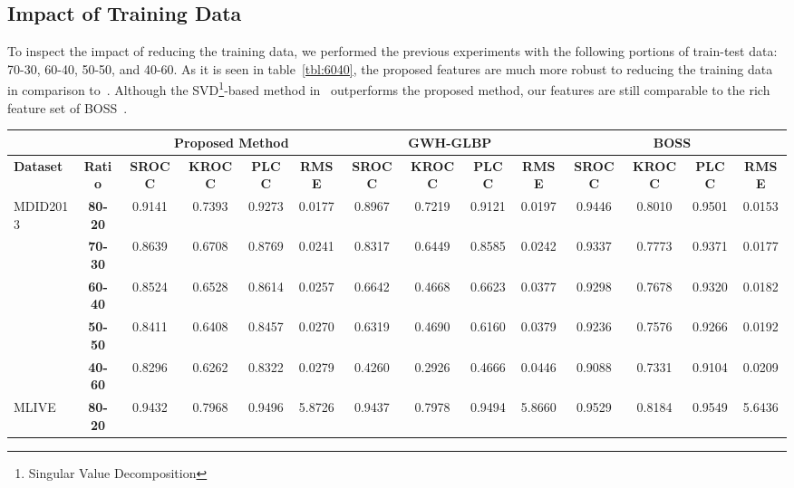 \subsection{Impact of Training Data}
To inspect the impact of reducing the training data, we performed the previous experiments with the following portions of train-test data: 70-30, 60-40, 50-50, and 40-60. As it is seen in table~\ref{tbl:6040}, the proposed features are much more robust to reducing the training data in comparison to~\cite{Li2016}. Although the SVD\footnote{Singular Value Decomposition}-based method in~\cite{Zhou2018} outperforms the proposed method, our features are still comparable to the rich feature set of BOSS~\cite{Zhou2018}.
\begin{sidewaystable}[htb]
    \caption{The Results for Changing the Ratio of Training Data.}
    \label{tbl:6040}
  \bigskip
    \centering\footnotesize\setlength\tabcolsep{2pt}
        \hspace*{-1cm}\begin{tabular}{m{1.7cm}|c||c|c|c|c||c|c|c|c||c|c|c|c}
             \multicolumn{2}{c||}{}&\multicolumn{4}{c||}{Proposed Method}&\multicolumn{4}{c||}{GWH-GLBP~\cite{Li2016}}&\multicolumn{4}{c}{BOSS~\cite{Zhou2018}}\\[1ex]
             \hline\hline
             \textbf{Dataset}&\textbf{Ratio}&\textbf{SROCC}&\textbf{KROCC}&\textbf{PLCC}&\textbf{RMSE}&\textbf{SROCC}&\textbf{KROCC}&\textbf{PLCC}&\textbf{RMSE}&\textbf{SROCC}&\textbf{KROCC}&\textbf{PLCC}&\textbf{RMSE}\\[1ex]
             \hline\hline
             \multirow{5}{4em}{MDID2013}&\textbf{80-20}&0.9141&0.7393&0.9273&0.0177&0.8967&0.7219&0.9121&0.0197&0.9446&0.8010&0.9501&0.0153\\[1ex]
             &\textbf{70-30}&0.8639&0.6708&0.8769&0.0241&0.8317&0.6449&0.8585&0.0242&0.9337&0.7773&0.9371&0.0177\\[1ex]
             &\textbf{60-40}&0.8524&0.6528&0.8614&0.0257&0.6642&0.4668&0.6623&0.0377&0.9298&0.7678&0.9320&0.0182\\[1ex]
             &\textbf{50-50}&0.8411&0.6408&0.8457&0.0270&0.6319&0.4690&0.6160&0.0379&0.9236&0.7576&0.9266&0.0192\\[1ex]
             &\textbf{40-60}&0.8296&0.6262&0.8322&0.0279&0.4260&0.2926&0.4666&0.0446&0.9088&0.7331&0.9104&0.0209\\[1ex]
             \hline\hline
             \multirow{5}{4em}{MLIVE}&\textbf{80-20}&0.9432&0.7968&0.9496&5.8726&0.9437&0.7978&0.9494&5.8660&0.9529&0.8184&0.9549&5.6436\\[1ex]

\end{tabular}
\end{sidewaystable}
